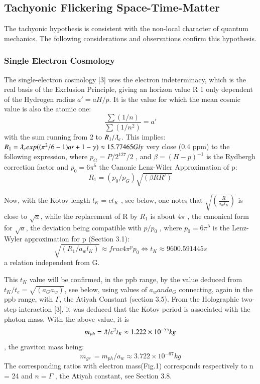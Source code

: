 \documentclass[twoside,draft]{article}
\begin{document}
\begin{sloppypar}
{\subsection{Tachyonic Flickering Space-Time-Matter}

The tachyonic hypothesis is consistent with the non-local character of quantum mechanics. The
following considerations and observations confirm this hypothesis.

\subsubsection{Single Electron Cosmology}

The single-electron cosmology [3] uses the electron indeterminacy, which is the real basis of the
Exclusion Principle, giving an horizon value R 1 only dependent of the Hydrogen radius $a\prime = aH/p$. It
is the value for which the mean cosmic value is also the atomic one:
\begin{equation}
\frac{\sum(1/n)}{\sum(1/n^{2})} = a\prime
\end{equation}
with the sum running from 2 to $R_{1} /\lambdabar_{e}$. This implies:
$R_{1} = \lambdabar_{e} exp((\pi^{2} /6 - 1)a\prime + 1 - \gamma) \approx 15.77465 Gly$
very close (0.4 ppm) to the following expression, where $p_{G} = P/2^{127}/2$ , and $\beta = (H - p)^{-1}$ is the
Rydbergh correction factor and $p_{0} = 6\pi^{5}$ the Canonic Lenz-Wiler Approximation of p:
\begin{equation}
R_{1} = ( p_{0} /p_{G} ) \sqrt{(\beta R R\prime)}
\end{equation}

Now, with the Kotov length $l_{K} = ct_{K}$ , see below, one notes that $\sqrt{(\frac{R}{a_{w} l_{K}})}$ is close to $\sqrt{a}$, while
the replacement of R by $R_{1}$ is about $4\pi$ , the canonical form for $\sqrt{a}$, the deviation being compatible
with $p/p_{0}$ , where $p_{0} = 6\pi^{5}$ is the Lenz-Wyler approximation for p (Section 3.1):
$$\sqrt{(R_{1} /a_{w} l_{K})} \approx frac{4\pi^{p}}{p_{0}} \Leftrightarrow t_{K} \approx 9 600.591445 s$$ a relation independent from G. 

This $t_K$ value will be confirmed, in the ppb range, by the value
deduced from $t_{K} /t_{e} = \sqrt{(a_{G} a_{w})}$, see below, using values of $a_{w} and a_{G}$ connecting, again in the ppb
range, with $\Gamma$, the Atiyah Constant (section 3.5).
From the Holographic two-step interaction [3], it was deduced that the Kotov period is
associated with the photon mass. With the above value, it is $$m_{ph} = \lambdabar/c^{2} t_{K} \approx 1.222 \times 10^{-55} kg$$, the
graviton mass being: 
\begin{equation}
m_{gr}\, = m_{ph} /a_{w} \approx 3.722 \times 10^{-67} kg
\end{equation} 
The corresponding ratios with electron mass(Fig.1) corresponds respectively to n = 24 and $n = \Gamma$ , the Atiyah constant, see Section 3.8.

}
\end{sloppypar}
\end{document}
